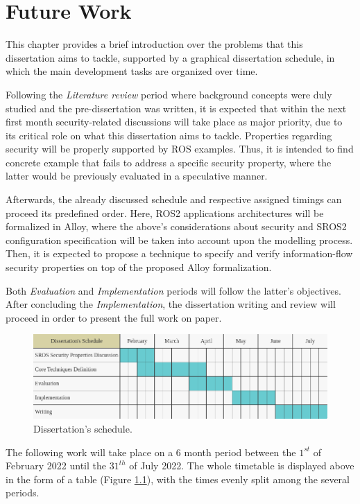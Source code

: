 \chapter{Future Work}\label{c:currWork}

This chapter provides a brief introduction over the problems that this dissertation aims to tackle, supported by a graphical dissertation schedule, in which the main development tasks are organized over time.

Following the \textit{Literature review} period where background concepts were duly studied and the pre-dissertation was written, it is expected that within the next first month security-related discussions will take place as major priority, due to its critical role on what this dissertation aims to tackle. Properties regarding security will be properly supported by ROS examples. Thus, it is intended to find concrete example that fails to address a specific security property, where the latter would be previously evaluated in a speculative manner. 

Afterwards, the already discussed schedule and respective assigned timings can proceed its predefined order. Here, ROS2 applications architectures will be formalized in Alloy, where the above's considerations about security and SROS2 configuration specification will be taken into account upon the modelling process. Then, it is expected to propose  a technique to specify and verify information-flow security properties on top of the proposed Alloy formalization.

Both \textit{Evaluation} and \textit{Implementation} periods will follow the latter's objectives. After concluding the \textit{Implementation}, the dissertation writing and review will proceed in order to present the full work on paper.

\begin{figure}[H]
    \centering
    \includegraphics[width=\linewidth]{img/dissertation-schedule.png}
    \caption{Dissertation's schedule.}
    \label{fig:dissertation-schedule}
\end{figure}

The following work will take place on a $6$ month period between the $1^{st}$ of February 2022 until the $31^{th}$ of July 2022. The whole timetable is displayed above in the form of a table (Figure \ref{fig:dissertation-schedule}), with the times evenly split among the several periods. 

